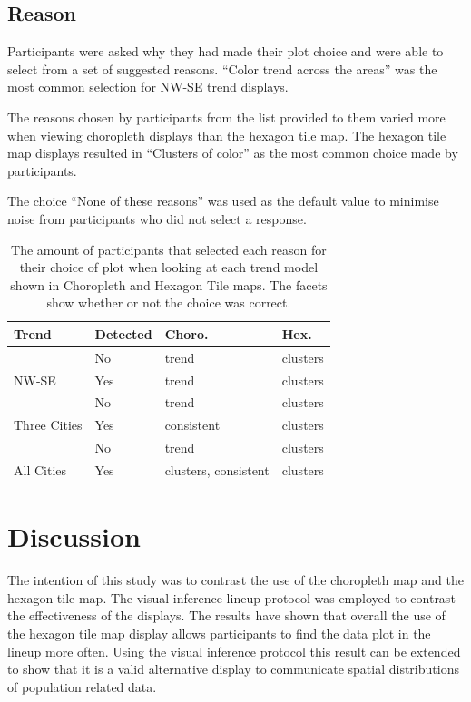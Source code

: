 \documentclass[conference,final,]{IEEEtran}
\begin{document}
\hypertarget{reason}{%
\subsection{Reason}\label{reason}}

Participants were asked why they had made their plot choice and were able to select from a set of suggested reasons.
``Color trend across the areas'' was the most common selection for NW-SE trend displays.

The reasons chosen by participants from the list provided to them varied more when viewing choropleth displays than the hexagon tile map.
The hexagon tile map displays resulted in ``Clusters of color'' as the most common choice made by participants.

The choice ``None of these reasons'' was used as the default value to minimise noise from participants who did not select a response.

\begin{table}

\caption{\label{tab:reason}The amount of participants that selected each reason for their choice of plot when looking at each trend model shown in Choropleth and Hexagon Tile maps. The facets show whether or not the choice was correct.}
\centering
\begin{tabular}[t]{llll}
\toprule
Trend & Detected & Choro. & Hex.\\
\midrule
 & No & trend & clusters\\
\cmidrule{2-4}
\multirow{-2}{*}{\raggedright\arraybackslash NW-SE} & Yes & trend & clusters\\
\cmidrule{1-4}
 & No & trend & clusters\\
\cmidrule{2-4}
\multirow{-2}{*}{\raggedright\arraybackslash Three Cities} & Yes & consistent & clusters\\
\cmidrule{1-4}
 & No & trend & clusters\\
\cmidrule{2-4}
\multirow{-2}{*}{\raggedright\arraybackslash All Cities} & Yes & clusters, consistent & clusters\\
\bottomrule
\end{tabular}
\end{table}

\hypertarget{discussion}{%
\section{Discussion}\label{discussion}}

The intention of this study was to contrast the use of the choropleth map and the hexagon tile map.
The visual inference lineup protocol was employed to contrast the effectiveness of the displays.
The results have shown that overall the use of the hexagon tile map display allows participants to find the data plot in the lineup more often.
Using the visual inference protocol this result can be extended to show that it is a valid alternative display to communicate spatial distributions of population related data.
\end{document}
